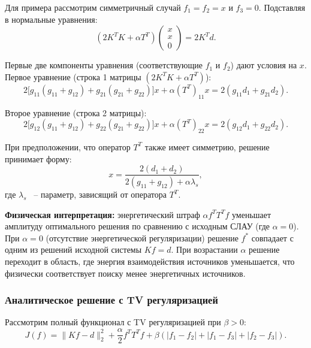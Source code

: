 \documentclass[sn-mathphys-num]{bst/sn-jnl}
\theoremstyle{thmstylethree}
\theoremstyle{thmstyletwo}
\theoremstyle{thmstyleone}
\begin{document}
Для примера рассмотрим симметричный случай $f_1 = f_2 = x$ и $f_3 = 0$. Подставляя в нормальные уравнения:
\begin{equation}
    (2K^TK + \alpha T^T) \begin{pmatrix} x \\ x \\ 0 \end{pmatrix} = 2K^Td.
\end{equation}

Первые две компоненты уравнения (соответствующие $f_1$ и $f_2$) дают условия на $x$. 
Первое уравнение (строка 1 матрицы $(2K^TK + \alpha T^T)$):
\begin{equation}
    2\bigl[g_{11}(g_{11}+g_{12}) + g_{21}(g_{21}+g_{22})\bigr]x + \alpha (T^T)_{11} x = 2(g_{11}d_1 + g_{21}d_2).
\end{equation}

Второе уравнение (строка 2 матрицы):
\begin{equation}
    2\bigl[g_{12}(g_{11}+g_{12}) + g_{22}(g_{21}+g_{22})\bigr]x + \alpha (T^T)_{22} x = 2(g_{12}d_1 + g_{22}d_2).
\end{equation}

При предположении, что оператор $T^T$ также имеет симметрию, решение принимает форму:
\begin{equation}
    x = \frac{2(d_1+d_2)}{2(g_{11}+g_{12}) + \alpha \lambda_s},
\end{equation}
где $\lambda_s$ ~-- параметр, зависящий от оператора $T^T$.

\textbf{Физическая интерпретация:} энергетический штраф $\alpha f^T T^T f$ уменьшает амплитуду оптимального решения по сравнению с исходным СЛАУ (где $\alpha=0$). 
При $\alpha=0$ (отсутствие энергетической регуляризации) решение $f^*$ совпадает с одним из решений исходной системы $Kf = d$.
При возрастании $\alpha$ решение переходит в область, где энергия взаимодействия источников уменьшается, что физически соответствует поиску менее энергетичных источников.

\subsubsection{Аналитическое решение с TV регуляризацией}

Рассмотрим полный функционал с TV регуляризацией при $\beta > 0$:
\begin{equation}
    J(f) = \|Kf-d\|_2^2 + \frac{\alpha}{2}f^T T^T f + \beta (|f_1-f_2| + |f_1-f_3| + |f_2-f_3|).
\end{equation}
\end{document}
